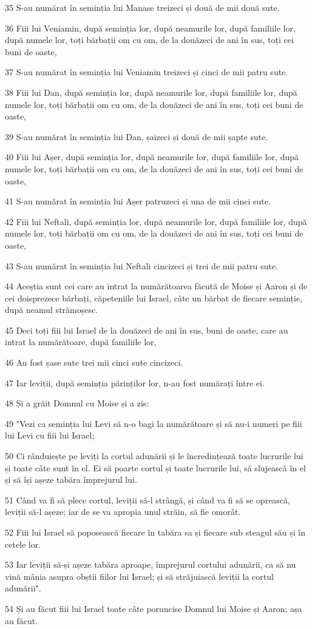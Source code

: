 \par 35 S-au numărat în seminția lui Manase treizeci și două de mii două sute.
\par 36 Fiii lui Veniamin, după seminția lor, după neamurile lor, după familiile lor, după numele lor, toți bărbații om cu om, de la douăzeci de ani în sus, toți cei buni de oaste,
\par 37 S-au numărat în seminția lui Veniamin treizeci și cinci de mii patru sute.
\par 38 Fiii lui Dan, după seminția lor, după neamurile lor, după familiile lor, după numele lor, toți bărbații om cu om, de la douăzeci de ani în sus, toți cei buni de oaste,
\par 39 S-au numărat în seminția lui Dan, șaizeci și două de mii șapte sute.
\par 40 Fiii lui Așer, după seminția lor, după neamurile lor, după familiile lor, după numele lor, toți bărbații om cu om, de la douăzeci de ani în sus, toți cei buni de oaste,
\par 41 S-au numărat în seminția lui Așer patruzeci și una de mii cinci sute.
\par 42 Fiii lui Neftali, după seminția lor, după neamurile lor, după familiile lor, după numele lor, toți bărbații om cu om, de la douăzeci de ani în sus, toți cei buni de oaste,
\par 43 S-au numărat în seminția lui Neftali cincizeci și trei de mii patru sute.
\par 44 Aceștia sunt cei care au intrat la numărătoarea făcută de Moise și Aaron și de cei doisprezece bărbați, căpeteniile lui Israel, câte un bărbat de fiecare seminție, după neamul strămoșesc.
\par 45 Deci toți fiii lui Israel de la douăzeci de ani în sus, buni de oaste, care au intrat la numărătoare, după familiile lor,
\par 46 Au fost șase sute trei mii cinci sute cincizeci.
\par 47 Iar leviții, după seminția părinților lor, n-au fost numărați între ei.
\par 48 Și a grăit Domnul cu Moise și a zis:
\par 49 "Vezi ca seminția lui Levi să n-o bagi la numărătoare și să nu-i numeri pe fiii lui Levi cu fiii lui Israel;
\par 50 Ci rânduiește pe leviți la cortul adunării și le încredințează toate lucrurile lui și toate câte sunt în el. Ei să poarte cortul și toate lucrurile lui, să slujească în el și să își așeze tabăra împrejurul lui.
\par 51 Când va fi să plece cortul, leviții să-l strângă, și când va fi să se oprească, leviții să-l așeze; iar de se va apropia unul străin, să fie omorât.
\par 52 Fiii lui Israel să poposească fiecare în tabăra sa și fiecare sub steagul său și în cetele lor.
\par 53 Iar leviții să-și așeze tabăra aproape, împrejurul cortului adunării, ca să nu vină mânia asupra obștii fiilor lui Israel; și să străjuiască leviții la cortul adunării".
\par 54 Și au făcut fiii lui Israel toate câte poruncise Domnul lui Moise și Aaron; așa au făcut.


